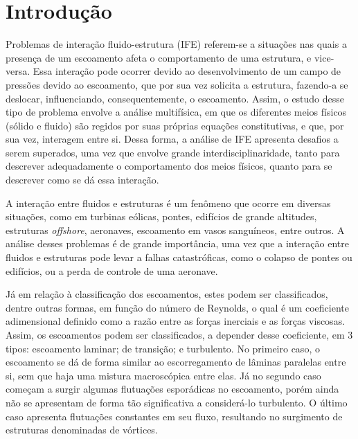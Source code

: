 \chapter{Introdução}\label{CapIntroducao}

Problemas de interação fluido-estrutura (IFE) referem-se a situações nas quais a presença de um escoamento afeta o comportamento de uma estrutura, e vice-versa. Essa interação pode ocorrer devido ao desenvolvimento de um campo de pressões devido ao escoamento, que por sua vez solicita a estrutura, fazendo-a se deslocar, influenciando, consequentemente, o escoamento. Assim, o estudo desse tipo de problema envolve a análise multifísica, em que os diferentes meios físicos (sólido e fluido) são regidos por suas próprias equações constitutivas, e que, por sua vez, interagem entre si. Dessa forma, a análise de IFE apresenta desafios a serem superados, uma vez que envolve grande interdisciplinaridade, tanto para descrever adequadamente o comportamento dos meios físicos, quanto para se descrever como se dá essa interação.

A interação entre fluidos e estruturas é um fenômeno que ocorre em diversas situações, como em turbinas eólicas, pontes, edifícios de grande altitudes, estruturas \textit{offshore}, aeronaves, escoamento em vasos sanguíneos, entre outros. A análise desses problemas é de grande importância, uma vez que a interação entre fluidos e estruturas pode levar a falhas catastróficas, como o colapso de pontes ou edifícios, ou a perda de controle de uma aeronave.

Já em relação à classificação dos escoamentos, estes podem ser classificados, dentre outras formas, em função do número de Reynolds, o qual é um coeficiente adimensional definido como a razão entre as forças inerciais e as forças viscosas. Assim, os escoamentos podem ser classificados, a depender desse coeficiente, em 3 tipos: escoamento laminar; de transição; e turbulento. No primeiro caso, o escoamento se dá de forma similar ao escorregamento de lâminas paralelas entre si, sem que haja uma mistura macroscópica entre elas. Já no segundo caso começam a surgir algumas flutuações esporádicas no escoamento, porém ainda não se apresentam de forma tão significativa a considerá-lo turbulento. O último caso apresenta flutuações constantes em seu fluxo, resultando no surgimento de estruturas denominadas de vórtices.

